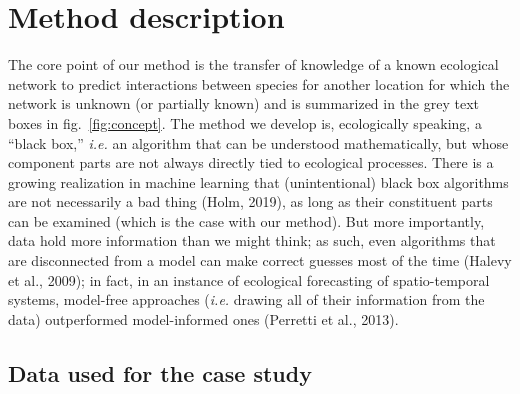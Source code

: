 \documentclass[10pt,oneside]{article}
\begin{document}
\hypertarget{method-description}{%
\section{Method description}\label{method-description}}

The core point of our method is the transfer of knowledge of a known
ecological network to predict interactions between species for another
location for which the network is unknown (or partially known) and is
summarized in the grey text boxes in fig.~\ref{fig:concept}. The method
we develop is, ecologically speaking, a ``black box,'' \emph{i.e.} an
algorithm that can be understood mathematically, but whose component
parts are not always directly tied to ecological processes. There is a
growing realization in machine learning that (unintentional) black box
algorithms are not necessarily a bad thing (Holm, 2019), as long as
their constituent parts can be examined (which is the case with our
method). But more importantly, data hold more information than we might
think; as such, even algorithms that are disconnected from a model can
make correct guesses most of the time (Halevy et al., 2009); in fact, in
an instance of ecological forecasting of spatio-temporal systems,
model-free approaches (\emph{i.e.} drawing all of their information from
the data) outperformed model-informed ones (Perretti et al., 2013).

\hypertarget{data-used-for-the-case-study}{%
\subsection{Data used for the case
study}\label{data-used-for-the-case-study}}
\end{document}
